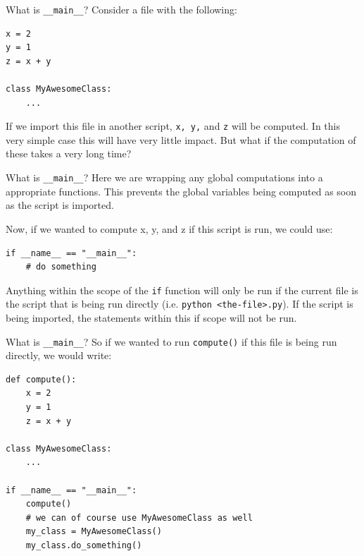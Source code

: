 \documentclass[10pt]{beamer}
\begin{document}
\begin{frame}[label={sec:org834e2ab},fragile]{What is \texttt{\_\_main\_\_}?}
 Consider a file with the following:

\begin{verbatim}
x = 2
y = 1
z = x + y

class MyAwesomeClass:
    ...
\end{verbatim}

If we import this file in another script, \texttt{x, y,} and \texttt{z} will be computed. In this very
simple case this will have very little impact. But what if the computation of these
takes a very long time?
\end{frame}

\begin{frame}[label={sec:orgc6f7ca4},fragile]{What is \texttt{\_\_main\_\_}?}
 Here we are wrapping any global computations into a appropriate functions. This
prevents the global variables being computed as soon as the script is imported.

Now, if we wanted to compute x, y, and z if this script is run, we could use:

\begin{verbatim}
if __name__ == "__main__":
    # do something
\end{verbatim}

Anything within the scope of the \texttt{if} function will only be run if the current file is
the script that is being run directly (i.e. \texttt{python <the-file>.py}). If the script is
being imported, the statements within this if scope will not be run.
\end{frame}

\begin{frame}[label={sec:orgac9ef50},fragile]{What is \texttt{\_\_main\_\_}?}
 So if we wanted to run \texttt{compute()} if this file is being run directly, we would write:

\begin{verbatim}
def compute():
    x = 2
    y = 1
    z = x + y

class MyAwesomeClass:
    ...

if __name__ == "__main__":
    compute()
    # we can of course use MyAwesomeClass as well
    my_class = MyAwesomeClass()
    my_class.do_something()
\end{verbatim}
\end{frame}
\end{document}
